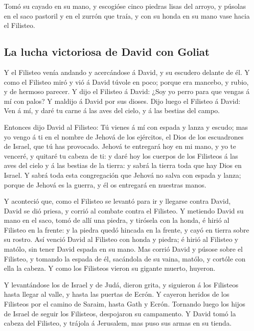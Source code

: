  Tomó su cayado en su mano, y escogióse cinco piedras lisas
del arroyo, y púsolas en el saco pastoril y en el zurrón que traía, y
con su honda en su mano vase hacia el Filisteo.

\hypertarget{la-lucha-victoriosa-de-david-con-goliat}{%
\subsection{La lucha victoriosa de David con
Goliat}\label{la-lucha-victoriosa-de-david-con-goliat}}

 Y el Filisteo venía andando y acercándose á David, y su
escudero delante de él.  Y como el Filisteo miró y vió á
David túvole en poco; porque era mancebo, y rubio, y de hermoso parecer.
 Y dijo el Filisteo á David: ¿Soy yo perro para que vengas
á mí con palos? Y maldijo á David por sus dioses.  Dijo
luego el Filisteo á David: Ven á mí, y daré tu carne á las aves del
cielo, y á las bestias del campo.

 Entonces dijo David al Filisteo: Tú vienes á mí con espada
y lanza y escudo; mas yo vengo á ti en el nombre de Jehová de los
ejércitos, el Dios de los escuadrones de Israel, que tú has provocado.
 Jehová te entregará hoy en mi mano, y yo te venceré, y
quitaré tu cabeza de ti: y daré hoy los cuerpos de los Filisteos á las
aves del cielo y á las bestias de la tierra: y sabrá la tierra toda que
hay Dios en Israel.  Y sabrá toda esta congregación que
Jehová no salva con espada y lanza; porque de Jehová es la guerra, y él
os entregará en nuestras manos.

 Y aconteció que, como el Filisteo se levantó para ir y
llegarse contra David, David se dió priesa, y corrió al combate contra
el Filisteo.  Y metiendo David su mano en el saco, tomó de
allí una piedra, y tirósela con la honda, é hirió al Filisteo en la
frente: y la piedra quedó hincada en la frente, y cayó en tierra sobre
su rostro.  Así venció David al Filisteo con honda y
piedra; é hirió al Filisteo y matólo, sin tener David espada en su mano.
 Mas corrió David y púsose sobre el Filisteo, y tomando la
espada de él, sacándola de su vaina, matólo, y cortóle con ella la
cabeza. Y como los Filisteos vieron su gigante muerto, huyeron.

 Y levantándose los de Israel y de Judá, dieron grita, y
siguieron á los Filisteos hasta llegar al valle, y hasta las puertas de
Ecrón. Y cayeron heridos de los Filisteos por el camino de Saraim, hasta
Gath y Ecrón.  Tornando luego los hijos de Israel de seguir
los Filisteos, despojaron su campamento.  Y David tomó la
cabeza del Filisteo, y trájola á Jerusalem, mas puso sus armas en su
tienda.

